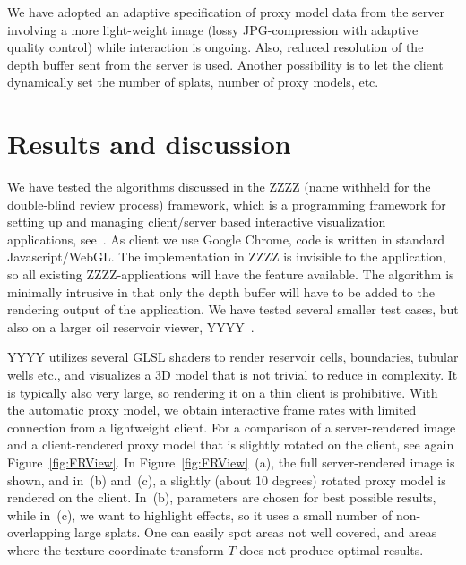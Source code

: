 We have adopted an adaptive specification of proxy model data from the server
involving a more light-weight image (lossy JPG-compression with adaptive quality
control) while interaction is ongoing.  Also, reduced resolution of the depth
buffer sent from the server is used. Another possibility is to let the client
dynamically set the number of splats, number of proxy models, etc.


\section{Results and discussion}

We have tested the algorithms discussed in the ZZZZ (name withheld for the
double-blind review process) framework, which is a programming framework for
setting up and managing client/server based interactive visualization
applications, see~\cite{tinia}. As client we use Google Chrome, code is written
in standard Javascript/WebGL.  The implementation in ZZZZ is invisible to the
application, so all existing ZZZZ-applications will have the feature
available. The algorithm is minimally intrusive in that only the depth buffer
will have to be added to the rendering output of the application. We have tested
several smaller test cases, but also on a larger oil reservoir viewer,
YYYY~\cite{cloudviz}.

YYYY utilizes several GLSL shaders to render reservoir cells, boundaries,
tubular wells etc., and visualizes a 3D model that is not trivial to reduce in
complexity. It is typically also very large, so rendering it on a thin client is
prohibitive. With the automatic proxy model, we obtain interactive frame rates
with limited connection from a lightweight client. For a comparison of a
server-rendered image and a client-rendered proxy model that is slightly rotated
on the client, see again Figure~\ref{fig:FRView}. In
Figure~\ref{fig:FRView}~(a), the full server-rendered image is shown, and in~(b)
and~(c), a slightly (about 10 degrees) rotated proxy model is rendered on the
client. In~(b), parameters are chosen for best possible results, while in~(c),
we want to highlight effects, so it uses a small number of non-overlapping large
splats. One can easily spot areas not well covered, and areas where the texture
coordinate transform $T$ does not produce optimal results.



